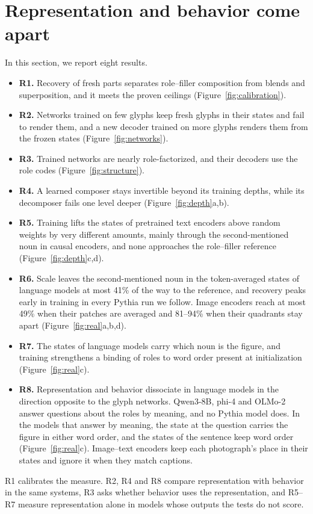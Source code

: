 \documentclass[10pt]{article}
\theoremstyle{plain}
\theoremstyle{remark}
\begin{document}
\section{Representation and behavior come apart}
\label{sec:results}

In this section, we report eight results.
\begin{itemize}
  \item \textbf{R1.} Recovery of fresh parts separates role--filler composition from blends and superposition, and it meets the proven ceilings (Figure~\ref{fig:calibration}).
  \item \textbf{R2.} Networks trained on few glyphs keep fresh glyphs in their states and fail to render them, and a new decoder trained on more glyphs renders them from the frozen states (Figure~\ref{fig:networks}).
  \item \textbf{R3.} Trained networks are nearly role-factorized, and their decoders use the role codes (Figure~\ref{fig:structure}).
  \item \textbf{R4.} A learned composer stays invertible beyond its training depths, while its decomposer fails one level deeper (Figure~\ref{fig:depth}a,b).
  \item \textbf{R5.} Training lifts the states of pretrained text encoders above random weights by very different amounts, mainly through the second-mentioned noun in causal encoders, and none approaches the role--filler reference (Figure~\ref{fig:depth}c,d).
  \item \textbf{R6.} Scale leaves the second-mentioned noun in the token-averaged states of language models at most 41\% of the way to the reference, and recovery peaks early in training in every Pythia run we follow. Image encoders reach at most 49\% when their patches are averaged and 81--94\% when their quadrants stay apart (Figure~\ref{fig:real}a,b,d).
  \item \textbf{R7.} The states of language models carry which noun is the figure, and training strengthens a binding of roles to word order present at initialization (Figure~\ref{fig:real}c).
  \item \textbf{R8.} Representation and behavior dissociate in language models in the direction opposite to the glyph networks. Qwen3-8B, phi-4 and OLMo-2 answer questions about the roles by meaning, and no Pythia model does. In the models that answer by meaning, the state at the question carries the figure in either word order, and the states of the sentence keep word order (Figure~\ref{fig:real}c). Image--text encoders keep each photograph's place in their states and ignore it when they match captions.
\end{itemize}
R1 calibrates the measure. R2, R4 and R8 compare representation with behavior in the same systems, R3 asks whether behavior uses the representation, and R5--R7 measure representation alone in models whose outputs the tests do not score.
\end{document}
